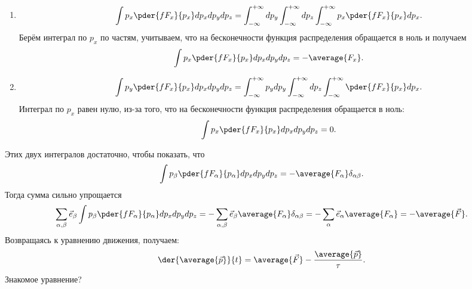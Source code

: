 \begin{enumerate}
    \item
            \[
                \int p_x \pder{fF_x}{p_x} dp_xdp_ydp_z =
                \int_{-\infty}^{+\infty} dp_y
                \int_{-\infty}^{+\infty} dp_z
                \int_{-\infty}^{+\infty} p_x \pder{fF_x}{p_x} dp_x.
            \]
            Берём интеграл по \( p_x \) по частям, учитываем, что на
            бесконечности функция распределения обращается в ноль и получаем
            \[
                \int p_x \pder{fF_x}{p_x} dp_xdp_ydp_z = -\average{F_x}.
            \]
    \item
            \[
                \int p_y \pder{fF_x}{p_x} dp_xdp_ydp_z =
                \int_{-\infty}^{+\infty} p_y dp_y
                \int_{-\infty}^{+\infty} dp_z
                \int_{-\infty}^{+\infty} \pder{fF_x}{p_x} dp_x.
            \]
            Интеграл по \( p_x \) равен нулю, из-за того, что на
            бесконечности функция распределения обращается в ноль:
            \[
                \int p_x \pder{fF_x}{p_x} dp_xdp_ydp_z = 0.
            \]
\end{enumerate}
Этих двух интегралов достаточно, чтобы показать, что
\[
    \int p_\beta \pder{fF_\alpha}{p_\alpha} dp_xdp_ydp_z =
    -\average{F_\alpha} \delta_{\alpha\beta}.
\]
Тогда сумма сильно упрощается
\[
    \sum_{\alpha,\beta}\vec{e}_\beta \int p_\beta \pder{fF_\alpha}{p_\alpha}
    dp_xdp_ydp_z =
    - \sum_{\alpha,\beta}\vec{e}_\beta \average{F_\alpha} \delta_{\alpha\beta} =
    - \sum_{\alpha}\vec{e}_\alpha \average{F_\alpha} = -\average{\vec{F}}.
\]
Возвращаясь к уравнению движения, получаем:
\[
    \der{\average{\vec{p}}}{t} = \average{\vec{F}}
    -\frac{\average{\vec{p}}}{\tau}.
\]
Знакомое уравнение?
